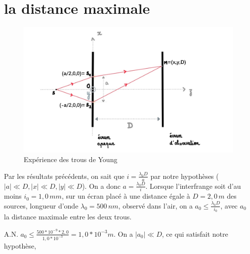 \documentclass[a4paper,12pt]{book}
\begin{document}
\renewcommand{\labelitemi}{$\blacktriangleright$}
\renewcommand{\labelitemii}{$\bullet$}


\section{la distance maximale}
\begin{figure}[h]
    \begin{center}
    \includegraphics[scale=0.8]{tr2.png}
    \end{center}
    \caption{Expérience des trous de Young}
\end{figure}
Par les résultats précédents, on sait que $i=\frac{\lambda_0D}{a}$ 
par notre hypothèses ($|a| \ll D, |x| \ll D, |y| \ll D$).
On a donc $a=\frac{\lambda_0D}{i}$. Lorsque l’interfrange soit 
d’au moins $i_0=1,0\,mm$, sur un écran placé à une distance égale à $D=2,0\,m$ 
des sources, longueur d'onde $\lambda_0=500\,nm$, observé dans l'air, on a $\boxed{a_0 \leq \frac{\lambda_0D}{i_0}}$, 
avec $a_0$ la distance maximale entre les deux trous. 

A.N. $\boxed{a_0 \leq \frac{500*10^{-9}*2,0}{1,0*10^{-3}}=1,0*10^{-3}m}$. 
On a $|a_0| \ll D $, ce qui satisfait notre hypothèse, 
\end{document}
